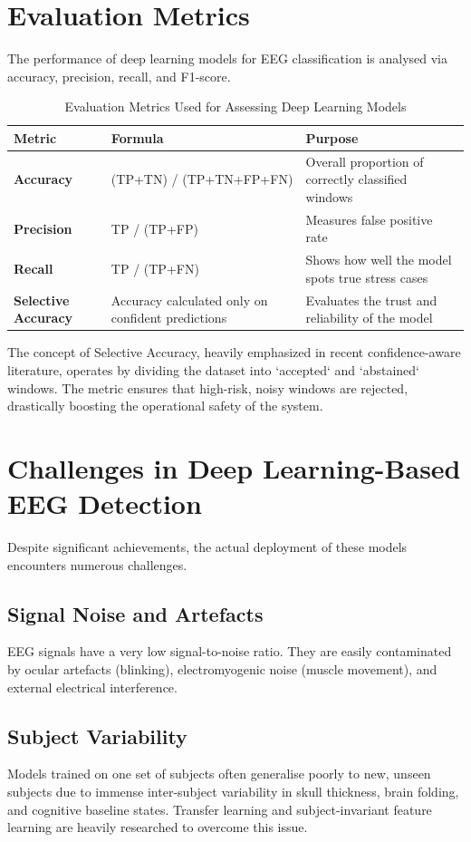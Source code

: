 \documentclass[12pt, a4paper]{article}
\begin{document}
\section{Evaluation Metrics}
The performance of deep learning models for EEG classification is analysed via accuracy, precision, recall, and F1-score. 

\begin{table}[H]
\centering
\caption{Evaluation Metrics Used for Assessing Deep Learning Models}
\vspace{0.2cm}
\begin{tabular}{p{3cm} p{6cm} p{5cm}}
\toprule
\textbf{Metric} & \textbf{Formula} & \textbf{Purpose} \\
\midrule
\textbf{Accuracy} & (TP+TN) / (TP+TN+FP+FN) & Overall proportion of correctly classified windows \\
\textbf{Precision} & TP / (TP+FP) & Measures false positive rate \\
\textbf{Recall} & TP / (TP+FN) & Shows how well the model spots true stress cases \\
\textbf{Selective Accuracy} & Accuracy calculated only on confident predictions & Evaluates the trust and reliability of the model \\
\bottomrule
\end{tabular}
\end{table}

The concept of Selective Accuracy, heavily emphasized in recent confidence-aware literature, operates by dividing the dataset into `accepted` and `abstained` windows. The metric ensures that high-risk, noisy windows are rejected, drastically boosting the operational safety of the system.

\section{Challenges in Deep Learning-Based EEG Detection}
Despite significant achievements, the actual deployment of these models encounters numerous challenges.

\subsection{Signal Noise and Artefacts}
EEG signals have a very low signal-to-noise ratio. They are easily contaminated by ocular artefacts (blinking), electromyogenic noise (muscle movement), and external electrical interference. 

\subsection{Subject Variability}
Models trained on one set of subjects often generalise poorly to new, unseen subjects due to immense inter-subject variability in skull thickness, brain folding, and cognitive baseline states. Transfer learning and subject-invariant feature learning are heavily researched to overcome this issue.
\end{document}
